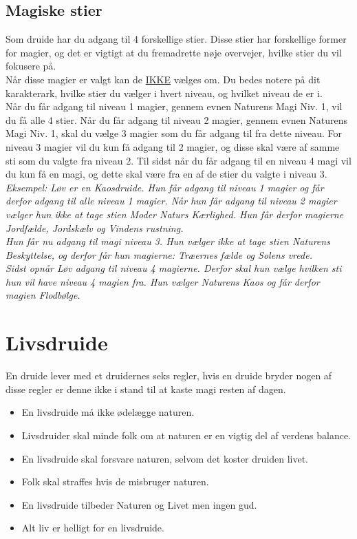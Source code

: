 \section*{Magiske stier}
Som druide har du adgang til 4 forskellige stier. Disse stier har forskellige former for magier, og det er vigtigt at du fremadrette nøje overvejer, hvilke stier du vil fokusere på.\\
Når disse magier er valgt kan de \underline{IKKE} vælges om. Du bedes notere på dit karakterark, hvilke stier du vælger i hvert niveau, og hvilket niveau de er i.\\
Når du får adgang til niveau 1 magier, gennem evnen Naturens Magi Niv. 1, vil du få alle 4 stier. Når du får adgang til niveau 2 magier, gennem evnen Naturens Magi Niv. 1, skal du vælge 3 magier som du får adgang til fra dette niveau. For niveau 3 magier vil du kun få adgang til 2 magier, og disse skal være af samme sti som du valgte fra niveau 2. Til sidst når du får adgang til en niveau 4 magi vil du kun få en magi, og dette skal være fra en af de stier du valgte i niveau 3. \\
\textit{Eksempel: Løv er en Kaosdruide. Hun får adgang til niveau 1 magier og får derfor adgang til alle niveau 1 magier. Når hun får adgang til niveau 2 magier vælger hun ikke at tage stien Moder Naturs Kærlighed. Hun får derfor magierne Jordfælde, Jordskælv og Vindens rustning.\\
Hun får nu adgang til magi niveau 3. Hun vælger ikke at tage stien Naturens Beskyttelse, og derfor får hun magierne: Træernes fælde og Solens vrede.\\
Sidst opnår Løv adgang til niveau 4 magierne. Derfor skal hun vælge hvilken sti hun vil have niveau 4 magien fra. Hun vælger Naturens Kaos og får derfor magien Flodbølge.\\}

\chapter*{Livsdruide}

En druide lever med et druidernes seks regler, hvis en druide bryder nogen af disse regler er denne ikke i stand til at kaste magi resten af dagen.
\begin{itemize}
    \item En livsdruide må ikke ødelægge naturen.
    \item Livsdruider skal minde folk om at naturen er en vigtig del af verdens balance.
    \item En livsdruide skal forsvare naturen, selvom det koster druiden livet.
    \item Folk skal straffes hvis de misbruger naturen.
    \item En livsdruide tilbeder Naturen og Livet men ingen gud.
    \item Alt liv er helligt for en livsdruide.
\end{itemize}




